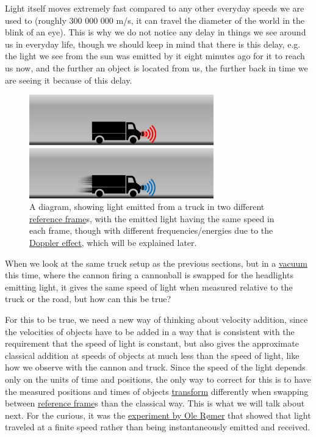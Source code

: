 Light itself moves extremely fast compared to any other everyday speeds we are used to (roughly 300 000 000 m/s, it can travel the diameter of the world in the blink of an eye). This is why we do not notice any delay in things we see around us in everyday life, though we should keep in mind that there is this delay, e.g. the light we see from the sun was emitted by it eight minutes ago for it to reach us now, and the further an object is located from us, the further back in time we are seeing it because of this delay.

\begin{figure}[ht]
	\centering
	\includegraphics[width=8cm]{images/pdf/lorry_torch.pdf}
	\caption{A diagram, showing light emitted from a truck in two different \protect\hyperlink{def-Reference-frame}{reference frame}s, with the emitted light having the same speed in each frame, though with different frequencies/energies due to the \protect\hyperlink{def-doppler-effect}{Doppler effect}, which will be explained later.}
	\label{fig: truck torch}
\end{figure}

When we look at the same truck setup as the previous sections, but in a \hyperlink{def-vacuum}{vacuum} this time, where the cannon firing a cannonball is swapped for the headlights emitting light, it gives the same speed of light when measured relative to the truck or the road, but how can this be true?

For this to be true, we need a new way of thinking about velocity addition, since the velocities of objects have to be added in a way that is consistent with the requirement that the speed of light is constant, but also gives the approximate classical addition at speeds of objects at much less than the speed of light, like how we observe with the cannon and truck. Since the speed of the light depends only on the units of time and positions, the only way to correct for this is to have the measured positions and times of objects \hyperlink{def-transform}{transform} differently when swapping between \hyperlink{def-Reference-frame}{reference frame}s than the classical way. This is what we will talk about next.
For the curious, it was the \href{https://scienceready.com.au/pages/determination-of-speed-of-light}{experiment by Ole Rømer} that showed that light traveled at a finite speed rather than being instantaneously emitted and received.

